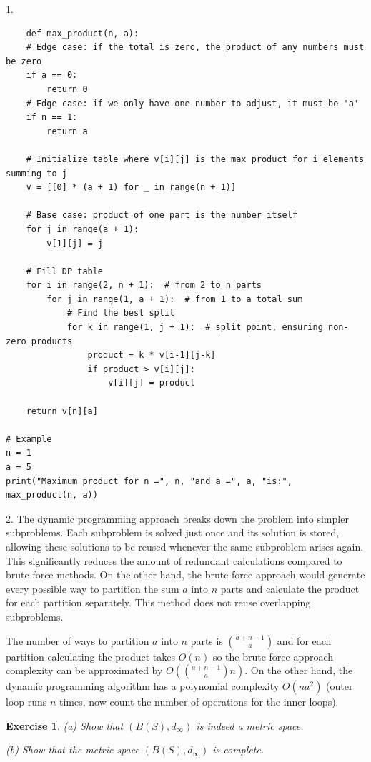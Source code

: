 \documentclass[letter,11pt]{article}
\newtheorem{exercise}{Exercise}[section]
\begin{document}
1.
\begin{verbatim}
    def max_product(n, a):
    # Edge case: if the total is zero, the product of any numbers must be zero
    if a == 0:
        return 0
    # Edge case: if we only have one number to adjust, it must be 'a'
    if n == 1:
        return a

    # Initialize table where v[i][j] is the max product for i elements summing to j
    v = [[0] * (a + 1) for _ in range(n + 1)]

    # Base case: product of one part is the number itself
    for j in range(a + 1):
        v[1][j] = j

    # Fill DP table
    for i in range(2, n + 1):  # from 2 to n parts
        for j in range(1, a + 1):  # from 1 to a total sum
            # Find the best split
            for k in range(1, j + 1):  # split point, ensuring non-zero products
                product = k * v[i-1][j-k]
                if product > v[i][j]:
                    v[i][j] = product

    return v[n][a]

# Example
n = 1
a = 5
print("Maximum product for n =", n, "and a =", a, "is:", max_product(n, a))

\end{verbatim}

2.  The dynamic programming approach breaks down the problem into simpler subproblems. Each subproblem is solved just once and its solution is stored, allowing these solutions to be reused whenever the same subproblem arises again. This significantly reduces the amount of redundant calculations compared to brute-force methods.
On the other hand, the brute-force approach would generate every possible way to partition the sum $a$ into $n$
 parts and calculate the product for each partition separately. This method does not  reuse overlapping subproblems.


The number of ways to partition 
$a$ into  $n$ parts is
$\binom{a+n-1}{a}$  and for each partition calculating the product takes $O(n)$ so the brute-force approach complexity can be approximated by $O (\binom{a+n-1}{a} n)$. On the other hand, the dynamic programming algorithm has a polynomial complexity $O(na^{2})$ (outer loop runs $n$ times, now count the number of operations for the inner loops).  

\begin{exercise} 
  (a)  Show that $(B(S),d_{\infty})$ is indeed a metric space. 

  (b) Show that the metric space $(B(S),d_{\infty})$ is complete. 
\end{exercise}
\end{document}
